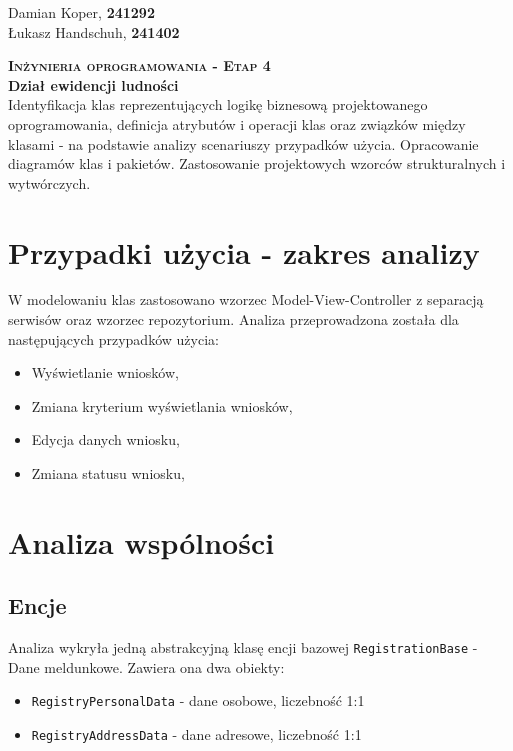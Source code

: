 \documentclass[12pt]{article}
\begin{document}
\begin{flushleft}
        Damian Koper, \textbf{241292} \\
        Łukasz Handschuh, \textbf{241402}
\end{flushleft}
\vspace{1cm}
{
    \centering
    {\Huge\scshape\bfseries Inżynieria oprogramowania - Etap 4 }\\
    \vspace{0.25cm}
    \Large\textbf{Dział ewidencji ludności} \\
    \vspace{0.25cm}
    \large Identyfikacja klas reprezentujących logikę biznesową
    projektowanego oprogramowania, definicja atrybutów i
    operacji klas oraz związków między klasami - na podstawie
    analizy scenariuszy przypadków użycia. Opracowanie
    diagramów klas i pakietów. Zastosowanie projektowych
    wzorców strukturalnych i wytwórczych.\\
}

\section{Przypadki użycia - zakres analizy}
W modelowaniu klas zastosowano wzorzec Model-View-Controller z separacją serwisów oraz wzorzec repozytorium. Analiza przeprowadzona została dla następujących przypadków użycia:
\begin{itemize}[noitemsep]
    \item Wyświetlanie wniosków,
    \item Zmiana kryterium wyświetlania wniosków,
    \item Edycja danych wniosku,
    \item Zmiana statusu wniosku, 
\end{itemize}

\section{Analiza wspólności}
\subsection{Encje}
Analiza wykryła jedną abstrakcyjną klasę encji bazowej \lstinline{RegistrationBase} - Dane meldunkowe. Zawiera ona dwa obiekty:
\begin{itemize}[noitemsep]
    \item \lstinline{RegistryPersonalData} - dane osobowe, liczebność 1:1
    \item \lstinline{RegistryAddressData} - dane adresowe, liczebność 1:1
\end{itemize}
\end{document}

